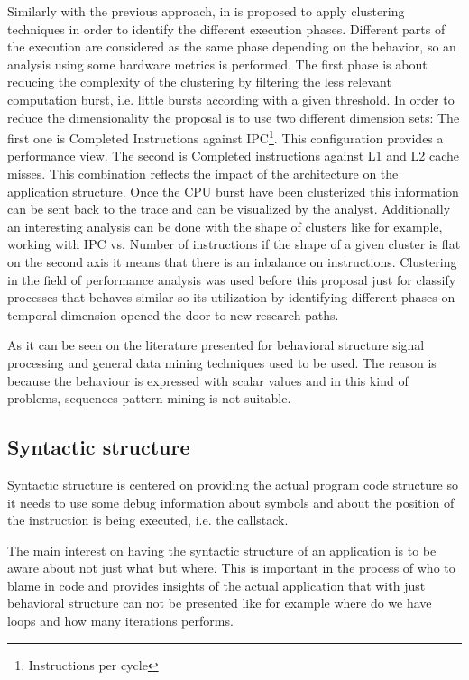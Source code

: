 Similarly with the previous approach, in 
\cite{gonzalez2013application} is proposed to apply clustering techniques in
order to identify the different execution phases. Different parts of the
execution are considered as the same phase depending on the behavior,
so an analysis using some hardware metrics is
performed. The first phase is about reducing the complexity of the clustering by
filtering the less relevant computation burst, i.e. little bursts according
with a given threshold. In order to reduce the dimensionality the proposal is to
use two different dimension sets: The first one is Completed Instructions
against IPC\footnote{Instructions per cycle}. This configuration provides a
performance view. The second is Completed instructions against L1 and L2 cache
misses. This combination reflects the impact of the architecture on the
application structure. Once the CPU burst have been clusterized this information
can be sent back to the trace and can be visualized by the analyst. Additionally
an interesting analysis can be done with the shape of clusters like for example,
working with IPC vs. Number of instructions if the shape of a given cluster is
flat on the second axis it means that there is an inbalance on instructions.
Clustering in the field of performance analysis was used before this proposal 
just for classify processes that behaves similar so its utilization by
identifying different phases on temporal dimension opened the door to new research
paths.

As it can be seen on the literature presented for behavioral structure signal
processing and general data mining techniques used to be used. The reason is
because the behaviour is expressed with scalar values and in this kind of
problems, sequences pattern mining is not suitable.

\subsection{Syntactic structure}

Syntactic structure is centered on providing the actual program code structure so
it needs to use some debug information about symbols and about the position of
the instruction is being executed, i.e. the callstack.

The main interest on having the syntactic structure of an application is to be
aware about not just what but where. This is important in the process of who to
blame in code and provides insights of the actual application that with just
behavioral structure can not be presented like for example where do we have
loops and how many iterations performs.

